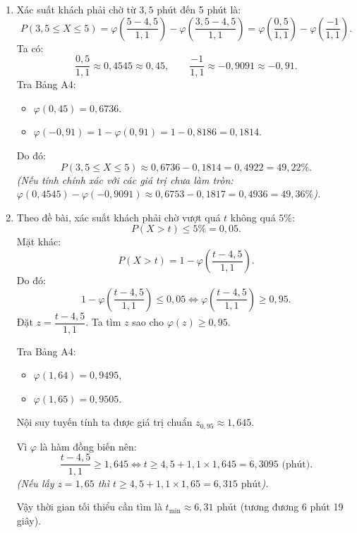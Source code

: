 \documentclass[12pt,a4paper]{article}
\theoremstyle{definition}
\begin{document}
\begin{enumerate}[label=\arabic*)]
    \item Xác suất khách phải chờ từ $3{,}5$ phút đến 5 phút là:
    \[
    P(3{,}5 \le X \le 5) = \varphi\left(\frac{5 - 4{,}5}{1{,}1}\right) - \varphi\left(\frac{3{,}5 - 4{,}5}{1{,}1}\right) = \varphi\left(\frac{0{,}5}{1{,}1}\right) - \varphi\left(\frac{-1}{1{,}1}\right).
    \]
    Ta có:
    \[
    \frac{0{,}5}{1{,}1} \approx 0{,}4545 \approx 0{,}45, \qquad \frac{-1}{1{,}1} \approx -0{,}9091 \approx -0{,}91.
    \]
    Tra Bảng A4:
    \begin{itemize}
        \item $\varphi(0{,}45) = 0{,}6736$.
        \item $\varphi(-0{,}91) = 1 - \varphi(0{,}91) = 1 - 0{,}8186 = 0{,}1814$.
    \end{itemize}
    Do đó:
    \[
    P(3{,}5 \le X \le 5) \approx 0{,}6736 - 0{,}1814 = 0{,}4922 = 49{,}22\%.
    \]
    \textit{(Nếu tính chính xác với các giá trị chưa làm tròn: $\varphi(0{,}4545) - \varphi(-0{,}9091) \approx 0{,}6753 - 0{,}1817 = 0{,}4936 = 49{,}36\%$).}

    \item Theo đề bài, xác suất khách phải chờ vượt quá $t$ không quá $5\%$:
    \[
    P(X > t) \le 5\% = 0{,}05.
    \]
    Mặt khác:
    \[
    P(X > t) = 1 - \varphi\left(\frac{t - 4{,}5}{1{,}1}\right).
    \]
    Do đó:
    \[
    1 - \varphi\left(\frac{t - 4{,}5}{1{,}1}\right) \le 0{,}05 \iff \varphi\left(\frac{t - 4{,}5}{1{,}1}\right) \ge 0{,}95.
    \]
    Đặt $z = \dfrac{t - 4{,}5}{1{,}1}$. Ta tìm $z$ sao cho $\varphi(z) \ge 0{,}95$.

    Tra Bảng A4:
    \begin{itemize}
        \item $\varphi(1{,}64) = 0{,}9495$,
        \item $\varphi(1{,}65) = 0{,}9505$.
    \end{itemize}
    Nội suy tuyến tính ta được giá trị chuẩn $z_{0{,}95} \approx 1{,}645$.

    Vì $\varphi$ là hàm đồng biến nên:
    \[
    \frac{t - 4{,}5}{1{,}1} \ge 1{,}645 \iff t \ge 4{,}5 + 1{,}1 \times 1{,}645 = 6{,}3095\text{ (phút)}.
    \]
    \textit{(Nếu lấy $z = 1{,}65$ thì $t \ge 4{,}5 + 1{,}1 \times 1{,}65 = 6{,}315\text{ phút}$).}

    Vậy thời gian tối thiểu cần tìm là $t_{\min} \approx 6{,}31\text{ phút}$ (tương đương 6 phút 19 giây).
\end{enumerate}
\end{document}
